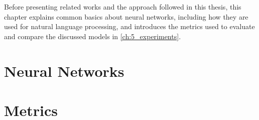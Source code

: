 Before presenting related works and the approach followed in this thesis, this chapter explains common basics about neural networks, including how they are used for natural language processing, and introduces the metrics used to evaluate and compare the discussed models in \autoref{ch:5_experiments}.


\section{Neural Networks}
\label{sec:2_basics/1_neural_networks}



\section{Metrics}
\label{sec:2_basics/2_metrics}


